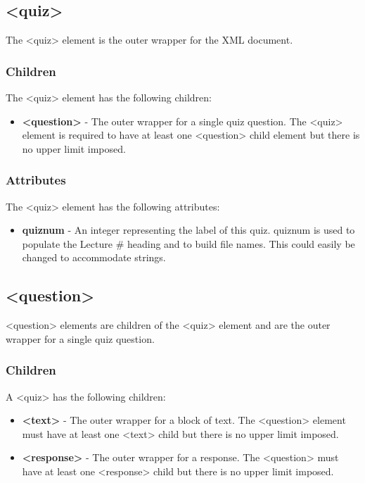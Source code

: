 \documentclass{article}
\begin{document}
	\subsection{{\textless}quiz{\textgreater}}
	The {\textless}quiz{\textgreater} element is the outer wrapper for the XML document. 
	\subsubsection{Children}
	The {\textless}quiz{\textgreater} element has the following children:
	\begin{itemize}
		\item \textbf{{\textless}question{\textgreater}} - 	The outer wrapper for a single quiz question. The {\textless}quiz{\textgreater} element is required to have at least one {\textless}question{\textgreater} child element but there is no upper limit imposed.
	\end{itemize}
	\subsubsection{Attributes}
	The {\textless}quiz{\textgreater} element has the following attributes:
	\begin{itemize}
		\item \textbf{quiznum} - An integer representing the label of this quiz. quiznum is used to populate the Lecture \# heading and to build file names. This could easily be changed to accommodate strings.
	\end{itemize}

	
	\subsection{{\textless}question{\textgreater}}
	{\textless}question{\textgreater} elements are children of the {\textless}quiz{\textgreater} element and are the outer wrapper for a single quiz question. 
	\subsubsection{Children}
	A {\textless}quiz{\textgreater} has the following children:
	\begin{itemize}
		 \item \textbf{\textless{text}\textgreater} - The outer wrapper for a block of text. The {\textless}{question}{\textgreater} element must have at least one {\textless}text{\textgreater} child but there is no upper limit imposed.
		 \item \textbf{\textless{response}\textgreater} - The outer wrapper for a response. The {\textless}{question}{\textgreater} must have at least one {\textless}response{\textgreater} child but there is no upper limit imposed.
	\end{itemize}
\end{document}
